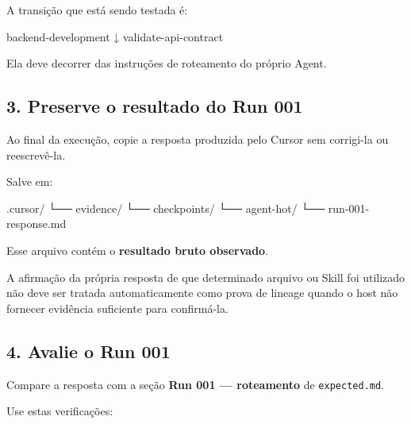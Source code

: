 \documentclass[
  10pt,
  a4paper,
  oneside]{book}
\newenvironment{Shaded}{}{}
\newcommand{\NormalTok}[1]{#1}
\renewenvironment{Shaded}{\begin{snugshade}}{\end{snugshade}}%
\begin{document}
A transição que está sendo testada é:

\begin{Shaded}
\begin{Highlighting}[]
\NormalTok{backend{-}development}
\NormalTok{        ↓}
\NormalTok{validate{-}api{-}contract}
\end{Highlighting}
\end{Shaded}

Ela deve decorrer das instruções de roteamento do próprio Agent.

\hypertarget{preserve-o-resultado-do-run-001}{%
\subsection{3. Preserve o resultado do Run
001}\label{preserve-o-resultado-do-run-001}}

Ao final da execução, copie a resposta produzida pelo Cursor sem
corrigi-la ou reescrevê-la.

Salve em:

\begin{Shaded}
\begin{Highlighting}[]
\NormalTok{.cursor/}
\NormalTok{└── evidence/}
\NormalTok{    └── checkpoints/}
\NormalTok{        └── agent{-}hot/}
\NormalTok{            └── run{-}001{-}response.md}
\end{Highlighting}
\end{Shaded}

Esse arquivo contém o \textbf{resultado bruto observado}.

A afirmação da própria resposta de que determinado arquivo ou Skill foi
utilizado não deve ser tratada automaticamente como prova de lineage
quando o host não fornecer evidência suficiente para confirmá-la.

\hypertarget{avalie-o-run-001}{%
\subsection{4. Avalie o Run 001}\label{avalie-o-run-001}}

Compare a resposta com a seção \textbf{Run 001 --- roteamento} de
\texttt{expected.md}.

Use estas verificações:
\end{document}
